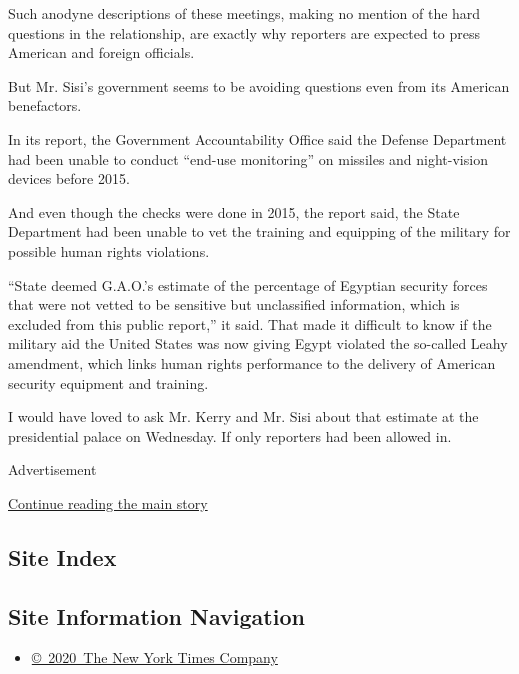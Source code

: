 Such anodyne descriptions of these meetings, making no mention of the
hard questions in the relationship, are exactly why reporters are
expected to press American and foreign officials.

But Mr. Sisi's government seems to be avoiding questions even from its
American benefactors.

In its report, the Government Accountability Office said the Defense
Department had been unable to conduct ``end-use monitoring'' on missiles
and night-vision devices before 2015.

And even though the checks were done in 2015, the report said, the State
Department had been unable to vet the training and equipping of the
military for possible human rights violations.

``State deemed G.A.O.'s estimate of the percentage of Egyptian security
forces that were not vetted to be sensitive but unclassified
information, which is excluded from this public report,'' it said. That
made it difficult to know if the military aid the United States was now
giving Egypt violated the so-called Leahy amendment, which links human
rights performance to the delivery of American security equipment and
training.

I would have loved to ask Mr. Kerry and Mr. Sisi about that estimate at
the presidential palace on Wednesday. If only reporters had been allowed
in.

Advertisement

\protect\hyperlink{after-bottom}{Continue reading the main story}

\hypertarget{site-index}{%
\subsection{Site Index}\label{site-index}}

\hypertarget{site-information-navigation}{%
\subsection{Site Information
Navigation}\label{site-information-navigation}}

\begin{itemize}
\tightlist
\item
  \href{https://help.nytimes.com/hc/en-us/articles/115014792127-Copyright-notice}{©~2020~The
  New York Times Company}
\end{itemize}

